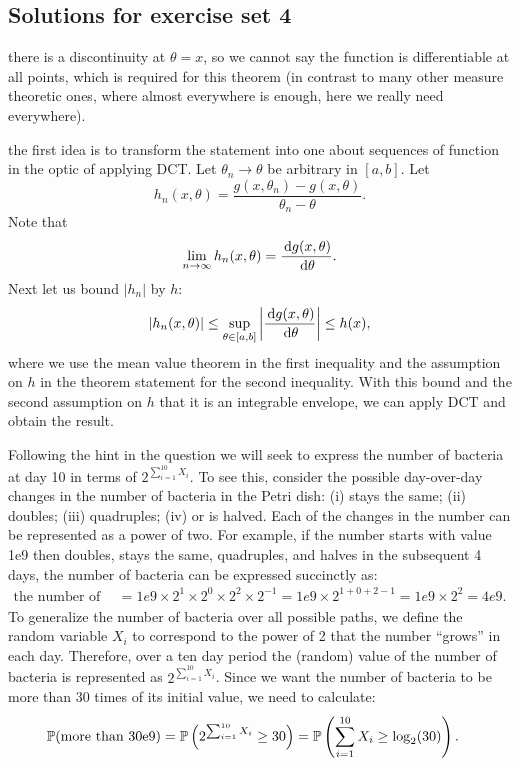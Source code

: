 \documentclass{article}
\begin{document}
\subsection{Solutions for exercise set 4}

 there is a discontinuity at $\theta = x$, so we cannot say the function is differentiable at all points, which is required for this theorem (in contrast to many other measure theoretic ones, where almost everywhere is enough, here we really need everywhere).

 the first idea is to transform the statement into one about sequences of function in the optic of applying DCT. Let $\theta_n \to \theta$ be arbitrary in $[a,b]$. Let 
\[ h_n(x, \theta) = \frac{g(x, \theta_n) - g(x, \theta)}{\theta_n - \theta}. \]
Note that
\[ \lim_{n\to \infty} h_n(x, \theta) = \frac{\ud g(x, \theta)}{\ud \theta}. \]
Next let us bound $|h_n|$ by $h$:
\[ |h_n(x, \theta) | \le \sup_{\theta \in [a,b]} \left| \frac{\ud g(x,\theta)}{\ud \theta}\right| \le h(x), \] 
where we use the mean value theorem in the first inequality and the assumption on $h$ in the theorem statement for the second inequality. With this bound and the second assumption on $h$ that it is an integrable envelope, we can apply DCT and obtain the result.

 Following the hint in the question we will seek to express the number of bacteria at day 10 in terms of $2^{\sum_{i=1}^{10} X_i}$. To see this, consider the possible day-over-day changes in the number of bacteria in the Petri dish: (i) stays the same; (ii) doubles; (iii) quadruples; (iv) or is halved. Each of the changes in the number can be represented as a power of two. For example, if the number starts with value 1e9 then doubles, stays the same, quadruples, and halves in the subsequent 4 days,  the number of bacteria can be expressed succinctly as: 
\begin{align*}
\mbox{the number of bacteria after 4 days} &= 1e9 \times 2^1 \times 2^0 \times 2^2 \times 2^{-1} =
1e9 \times 2^{1 + 0 + 2 - 1} = 1e9 \times 2^{2} = 4e9. 
\end{align*}
To generalize the number of bacteria over all possible paths, we define the random variable $X_i$ to correspond to the power of 2 that the number ``grows'' in each day. Therefore, over a ten day period the (random) value of the number of bacteria is represented as $2^{\sum_{i=1}^{10} X_i}$. Since we want the number of bacteria to be more than 30 times of its initial value, we need to calculate:
\begin{align*}
\P(\mbox{more than 30e9}) &= \P\left(2^{\sum_{i=1}^{10}X_i} \geq 30\right) = \P\left(\sum_{i=1}^{10}X_i \geq \log_2(30)\right).
\end{align*}
\end{document}
